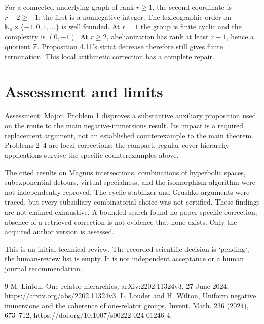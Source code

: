 \documentclass[10pt]{article}
\begin{document}
For a connected underlying graph of rank \(r\ge1\), the second coordinate is \(r-2\ge-1\); the first is a nonnegative integer. The lexicographic order on \(\mathbb N_0\times\{-1,0,1,\ldots\}\) is well founded. At \(r=1\) the group is finite cyclic and the complexity is \((0,-1)\). At \(r\ge2\), abelianization has rank at least \(r-1\), hence a quotient \(\mathbb Z\). Proposition 4.11’s strict decrease therefore still gives finite termination. This local arithmetic correction has a complete repair.\par
\section*{Assessment and limits}
Assessment: Major. Problem 1 disproves a substantive auxiliary proposition used on the route to the main negative-immersions result. Its impact is a required replacement argument, not an established counterexample to the main theorem. Problems 2–4 are local corrections; the compact, regular-cover hierarchy applications survive the specific counterexamples above.\par
The cited results on Magnus intersections, combinations of hyperbolic spaces, subexponential detours, virtual specialness, and the isomorphism algorithm were not independently reproved. The cyclic-stabilizer and Grushko arguments were traced, but every subsidiary combinatorial choice was not certified. These findings are not claimed exhaustive. A bounded search found no paper-specific correction; absence of a retrieved correction is not evidence that none exists. Only the acquired author version is assessed.\par
This is an initial technical review. The recorded scientific decision is `pending`; the human-review list is empty. It is not independent acceptance or a human journal recommendation.\par
9 M. Linton, One-relator hierarchies, arXiv:2202.11324v3, 27 June 2024, https://arxiv.org/abs/2202.11324v3. L. Louder and H. Wilton, Uniform negative immersions and the coherence of one-relator groups, Invent. Math. 236 (2024), 673–712, https://doi.org/10.1007/s00222-024-01246-4.\par
\end{document}
